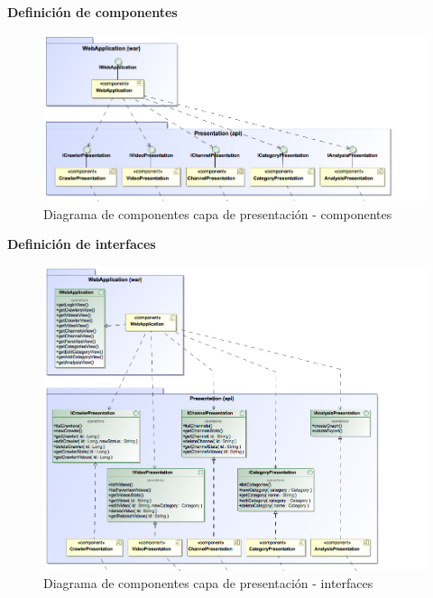 \documentclass[11pt,a4paper]{article}
\begin{document}
\noindent\textbf{Definición de componentes}
\begin{figure}[H]
\centering
\includegraphics[scale=0.35]{diseno/presentacion/ComponentsDiagram.png}
\caption{Diagrama de componentes capa de presentación - componentes}
\end{figure}
\newpage 

\noindent\textbf{Definición de interfaces}
\begin{figure}[H]
\centering
\includegraphics[scale=0.3]{diseno/presentacion/ComponentDiagram2.png}
\caption{Diagrama de componentes capa de presentación - interfaces}
\end{figure}
\end{document}
